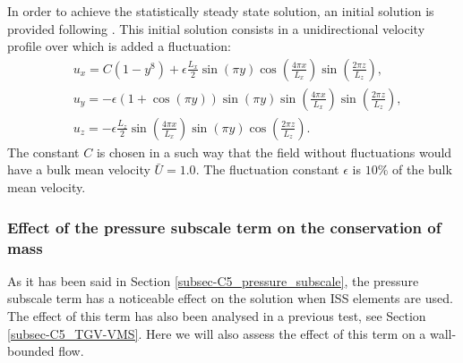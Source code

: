 In order to achieve the statistically steady state solution, an initial solution is provided following \cite{moin_numerical_1980}. This initial solution consists in a unidirectional velocity profile over which is added a fluctuation:
\begin{align}
\label{eq-C5_TCF_initial_sol}
&u_x = C\left(1-y^8\right)+\epsilon\frac{L_x}{2}\sin(\pi y)\cos\left(\frac{4\pi x}{L_x}\right)\sin\left(\frac{2\pi z}{L_z}\right),\\\nonumber
&u_y = -\epsilon(1+\cos(\pi y))\sin(\pi y)\sin\left(\frac{4\pi x}{L_x}\right)\sin\left(\frac{2\pi z}{L_z}\right),\\
&u_z = -\epsilon\frac{L_z}{2}\sin\left(\frac{4\pi x}{L_x}\right)\sin(\pi y)\cos\left(\frac{2\pi z}{L_z}\right).\nonumber
\end{align}
The constant $C$ is chosen in a such way that the field without fluctuations would have a bulk mean velocity $\bar{U}=1.0$. The fluctuation constant $\epsilon$ is $10\%$ of the bulk mean velocity.

\subsubsection{Effect of the pressure subscale term on the conservation of mass}
As it has been said in Section \ref{subsec-C5_pressure_subscale}, the pressure subscale term has a noticeable effect on the solution when ISS elements are used. The effect of this term has also been analysed in a previous test, see Section \ref{subsec-C5_TGV-VMS}. Here we will also assess the effect of this term on a wall-bounded flow.

